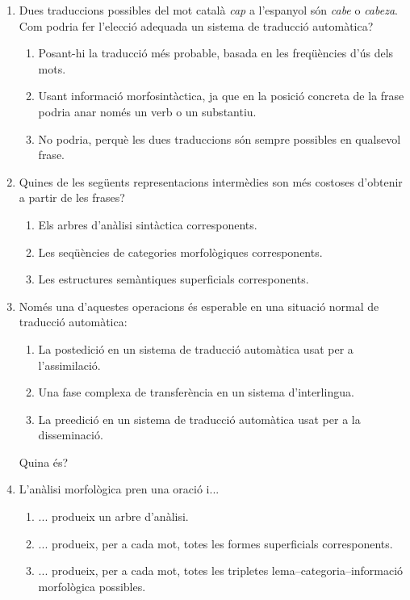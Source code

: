 \begin{enumerate}
\item Dues traduccions possibles del mot català \emph{cap} 
 a l'espanyol
 són \emph{cabe} o \emph{cabeza}. Com podria fer l'elecció
adequada un sistema de traducció automàtica?
 \begin{enumerate}
 \item Posant-hi la traducció més probable, basada en
 les freqüències d'ús dels mots.
 \item Usant informació morfosintàctica, ja que
 en la posició concreta de la frase podria
 anar només un verb o un substantiu.
 \item No podria, perquè les dues traduccions són
 sempre possibles en qualsevol frase.
 \end{enumerate}

\item Quines  de les següents representacions intermèdies 
      son més costoses d'obtenir a partir de les frases?
      \begin{enumerate}
      \item Els arbres d'anàlisi sintàctica corresponents.
      \item Les seqüències de categories morfològiques
           corresponents.
      \item Les estructures semàntiques superficials corresponents.
      \end{enumerate}

\item Només una d'aquestes operacions és  esperable en una
      situació  normal de traducció automàtica:
      \begin{enumerate}
      \item La postedició en un sistema de traducció automàtica 
            usat per a l'assimilació.
      \item Una fase complexa de 
            transferència en un sistema d'interlingua.
      \item La preedició en un sistema de traducció automàtica
            usat per a la disseminació. 
      \end{enumerate}
      Quina és?


\item L'anàlisi morfològica pren una oració i...
\begin{enumerate}
\item ... produeix un arbre d'anàlisi.
\item ... produeix, per a cada mot, totes les formes superficials corresponents.
\item ... produeix, per a cada mot, totes les tripletes
  lema--categoria--informació morfològica possibles.
\end{enumerate}



\end{enumerate}
